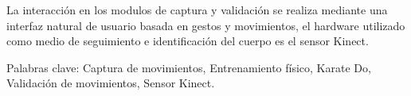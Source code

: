 {{La interacción en los modulos de captura y validación se realiza mediante una interfaz natural de usuario basada en gestos y movimientos, el hardware utilizado como medio de seguimiento e identificación del cuerpo es el sensor Kinect.\\
\begin{flushleft}
Palabras clave: Captura de movimientos, Entrenamiento físico, Karate Do, Validación de movimientos, Sensor Kinect.
\end{flushleft}
}}

\clearpage
\thispagestyle{empty}
\hphantom{1cm}
\pagebreak

